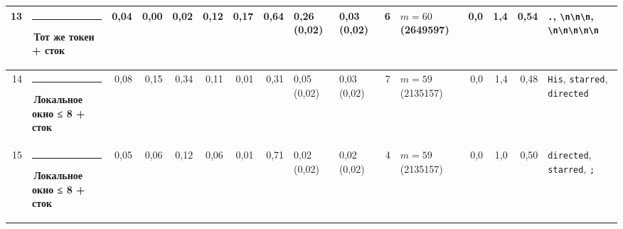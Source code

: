 \documentclass[10pt]{article}
\begin{document}
\begin{minipage}{\linewidth}
\begin{center}
{\begin{tabular}{|r|l|r|r|r|r|r|r|l|l|r|l|r|r|r|l|}
13 & \textcolor[HTML]{E87BA4}{\rule{0.62em}{0.62em}}\,\textbf{Тот же токен + сток} & 0,04 & 0,00 & 0,02 & 0,12 & 0,17 & 0,64 & 0,26 (0,02) & 0,03 (0,02) & 6 & $m{=}60$ (2649597) & 0,0 & 1,4 & 0,54 & \texttt{\textvisiblespace{}.}, \texttt{\textvisiblespace{}\textbackslash{}n\textbackslash{}n\textbackslash{}n}, \texttt{\textvisiblespace{}\textbackslash{}n\textbackslash{}n\textbackslash{}n\textbackslash{}n\textbackslash{}n} \\ \hline
14 & \textcolor[HTML]{1BAF7A}{\rule{0.62em}{0.62em}}\,\textbf{Локальное окно ≤ 8 + сток} & 0,08 & 0,15 & 0,34 & 0,11 & 0,01 & 0,31 & 0,05 (0,02) & 0,03 (0,02) & 7 & $m{=}59$ (2135157) & 0,0 & 1,4 & 0,48 & \texttt{\textvisiblespace{}His}, \texttt{\textvisiblespace{}starred}, \texttt{\textvisiblespace{}directed} \\ \hline
15 & \textcolor[HTML]{1BAF7A}{\rule{0.62em}{0.62em}}\,\textbf{Локальное окно ≤ 8 + сток} & 0,05 & 0,06 & 0,12 & 0,06 & 0,01 & 0,71 & 0,02 (0,02) & 0,02 (0,02) & 4 & $m{=}59$ (2135157) & 0,0 & 1,0 & 0,50 & \texttt{\textvisiblespace{}directed}, \texttt{\textvisiblespace{}starred}, \texttt{\textvisiblespace{};} \\ \hline
\hline\end{tabular}}\end{center}
\end{minipage}
\par\vspace{0.4em}
\end{document}
